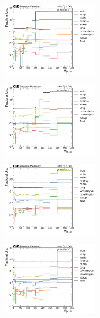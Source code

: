 \begin{figure}[ht!]
  \centering
  \begin{subfigure}
    \centering
    \includegraphics[width=0.45\textwidth]{figures/multijet/dijet/fracUnc_groomed_0.pdf}
\end{subfigure} 
  \begin{subfigure}
    \centering
    \includegraphics[width=0.45\textwidth]{figures/multijet/dijet/fracUnc_groomed_1.pdf}
\end{subfigure}
  \begin{subfigure}
    \centering
    \includegraphics[width=0.45\textwidth]{figures/multijet/dijet/fracUnc_groomed_2.pdf}
\end{subfigure}
  \begin{subfigure}
    \centering
    \includegraphics[width=0.45\textwidth]{figures/multijet/dijet/fracUnc_groomed_3.pdf}

\end{subfigure}
\end{figure}
